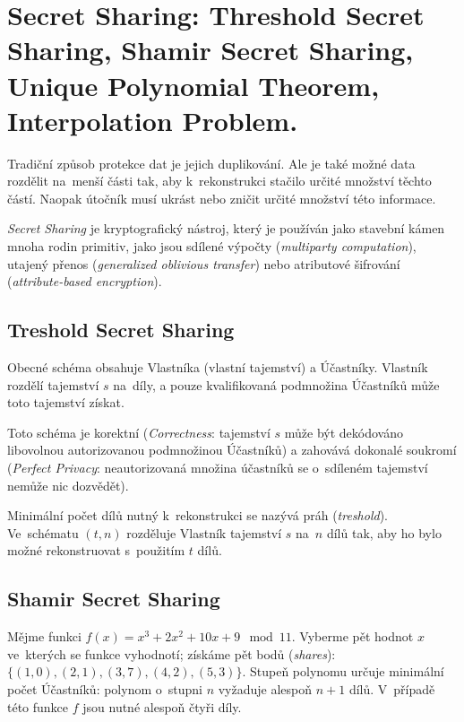 \clearpage
\section{Secret Sharing: Threshold Secret Sharing, Shamir Secret Sharing, Unique Polynomial Theorem, Interpolation Problem.}

Tradiční způsob protekce dat je jejich duplikování.
Ale je také možné data rozdělit na~menší části tak, aby k~rekonstrukci stačilo určité množství těchto částí.
Naopak útočník musí ukrást nebo zničit určité množství této informace.

\emph{Secret Sharing} je kryptografický nástroj, který je používán jako stavební kámen mnoha rodin primitiv, jako jsou sdílené výpočty (\emph{multiparty computation}), utajený přenos (\emph{generalized oblivious transfer}) nebo atributové šifrování (\emph{attribute-based encryption}).

\subsection{Treshold Secret Sharing}

Obecné schéma obsahuje Vlastníka (vlastní tajemství) a Účastníky.
Vlastník rozdělí tajemství $s$ na~díly, a pouze kvalifikovaná podmnožina Účastníků může toto tajemství získat.

Toto schéma je korektní (\emph{Correctness}: tajemství $s$ může být dekódováno libovolnou autorizovanou podmnožinou Účastníků) a zahovává dokonalé soukromí (\emph{Perfect Privacy}: neautorizovaná množina účastníků se o~sdíleném tajemství nemůže nic dozvědět).

Minimální počet dílů nutný k~rekonstrukci se nazývá práh (\emph{treshold}).
Ve~schématu $(t,n)$ rozděluje Vlastník tajemství $s$ na~$n$ dílů tak, aby ho bylo možné rekonstruovat s~použitím $t$ dílů.

\subsection{Shamir Secret Sharing}
\label{sec:sharmir-secret-sharing}

Mějme funkci $f(x) = x^3 + 2x^2 + 10x + 9 \mod 11$.
Vyberme pět hodnot $x$ ve~kterých se funkce vyhodnotí; získáme pět bodů (\emph{shares}): $\{(1,0),(2,1),(3,7),(4,2),(5,3)\}$.
Stupeň polynomu určuje minimální počet Účastníků: polynom o~stupni $n$ vyžaduje alespoň $n+1$ dílů.
V~případě této funkce $f$ jsou nutné alespoň čtyři díly.


